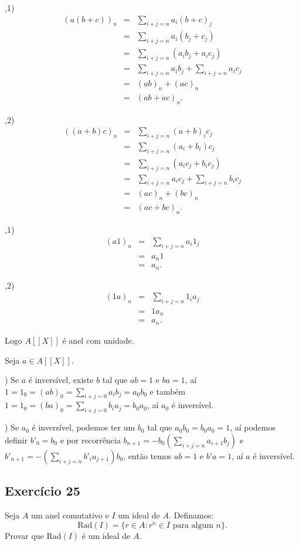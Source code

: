 \documentclass[10pt,a4paper]{article}
\begin{document}
\smallskip
{},1)
\[
\begin{array}{rcl}
(a(b+c))_n&=&\sum_{i+j=n}a_i(b+c)_j\\&=&\sum_{i+j=n}a_i(b_j+c_j)\\&=&\sum_{i+j=n}(a_ib_j+a_ic_j)\\&=&\sum_{i+j=n}a_ib_j+\sum_{i+j=n}a_ic_j\\&=&(ab)_n+(ac)_n\\&=&(ab+ac)_n.
\end{array}
\]

\smallskip
{},2)
\[
\begin{array}{rcl}
((a+b)c)_n&=&\sum_{i+j=n}(a+b)_ic_j\\&=&\sum_{i+j=n}(a_i+b_i)c_j\\&=&\sum_{i+j=n}(a_ic_j+b_ic_j)\\&=&\sum_{i+j=n}a_ic_j+\sum_{i+j=n}b_ic_j\\&=&(ac)_n+(bc)_n\\&=&(ac+bc)_n.
\end{array}
\]

\smallskip
{},1)
\[
\begin{array}{rcl}
(a1)_n&=&\sum_{i+j=n}a_i1_j\\&=&a_n1\\&=&a_n.
\end{array}
\]

\smallskip
{},2)
\[
\begin{array}{rcl}
(1a)_n&=&\sum_{i+j=n}1_ia_j\\&=&1a_n\\&=&a_n.
\end{array}
\]

\noindent
Logo $A[[X]]$ é anel com unidade.

\medskip
\noindent
Seja $a\in A[[X]]$.

\medskip
{}) Se $a$ é inversível, existe $b$ tal que $ab=1$ e $ba=1$, aí $1=1_0=(ab)_0=\sum_{i+j=0}a_ib_j=a_0b_0$ e também $1=1_0=(ba)_0=\sum_{i+j=0}b_ia_j=b_0a_0$, aí $a_0$ é inversível.

\medskip
{}) Se $a_0$ é inversível, podemos ter um $b_0$ tal que $a_0b_0=b_0a_0=1$, aí podemos definir $b'_0=b_0$ e por recorrência $b_{n+1}=-b_0(\sum_{i+j=n}a_{i+1}b_j)$ e $b'_{n+1}=-(\sum_{i+j=n}b'_ia_{j+1})b_0$, então temos $ab=1$ e $b'a=1$, aí $a$ é inversível.

\subsection*{Exercício 25}
Seja $A$ um anel comutativo e $I$ um ideal de $A$. Definamos:
\[
\mathrm{Rad}(I)=\{r\in A:r^n\in I\text{ para algum }n\}.
\]
Provar que $\mathrm{Rad}(I)$ é um ideal de $A$.
\end{document}
